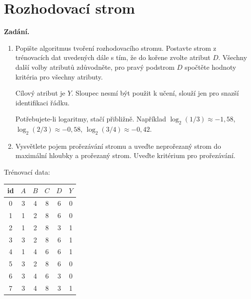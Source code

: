 \section{Rozhodovací strom}

\noindent\textbf{Zadání.}\par
\begin{enumerate}
  \item[a)] Popište algoritmus tvoření rozhodovacího stromu. Postavte strom z trénovacích dat uvedených
    dále s tím, že do kořene zvolte atribut $D$. Všechny další volby atributů zdůvodněte, pro pravý
    podstrom $D$ spočtěte hodnoty kritéria pro všechny atributy.

    Cílový atribut je $Y$. Sloupec  nesmí být použit k učení, slouží jen pro snazší identifikaci řádku.

    Potřebujete-li logaritmy, stačí přibližně. Například $\log_2(1/3) \approx -1{,}58$,
    $\log_2(2/3) \approx -0{,}58$, $\log_2(3/4) \approx -0{,}42$.
  \item[b)] Vysvětlete pojem prořezávání stromu a uveďte neprořezaný strom do maximální hloubky a prořezaný
    strom. Uveďte kritérium pro prořezávání.
\end{enumerate}

\begin{center}
Trénovací data:\par\medskip
\begin{tabular}{cccccc}
\toprule
id & $A$ & $B$ & $C$ & $D$ & $Y$ \\
\midrule
0 & 3 & 4 & 8 & 6 & 0 \\
1 & 1 & 2 & 8 & 6 & 0 \\
2 & 1 & 2 & 8 & 3 & 1 \\
3 & 3 & 2 & 8 & 6 & 1 \\
4 & 1 & 4 & 6 & 6 & 1 \\
5 & 3 & 2 & 8 & 6 & 0 \\
6 & 3 & 4 & 6 & 3 & 0 \\
7 & 3 & 4 & 8 & 3 & 1 \\
\bottomrule
\end{tabular}
\end{center}

